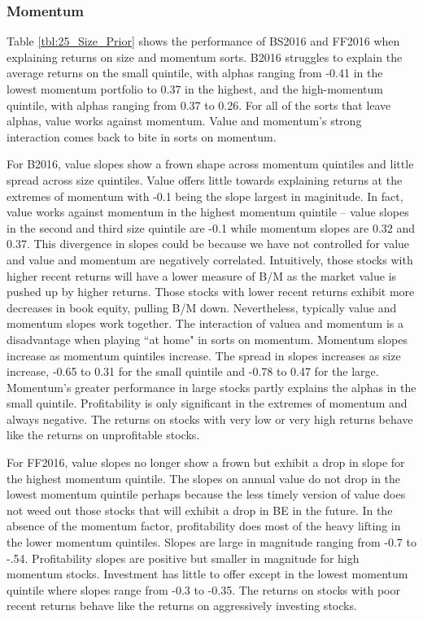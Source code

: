 
\subsubsection{Momentum}


Table \ref{tbl:25_Size_Prior} shows the performance of BS2016 and FF2016 when explaining
returns on size and momentum sorts. B2016 struggles to explain the average returns on the
small quintile, with alphas ranging from -0.41 in the lowest momentum portfolio to 0.37 in
the highest, and the high-momentum quintile, with alphas ranging from 0.37 to 0.26. For
all of the sorts that leave alphas, value works against momentum. Value and momentum's
strong interaction comes back to bite in sorts on momentum.

For B2016, value slopes show a frown shape across momentum quintiles and little spread
across size quintiles. Value offers little towards explaining returns at the extremes of
momentum with -0.1 being the slope largest in maginitude. In fact, value works against
momentum in the highest momentum quintile -- value slopes in the second and third size
quintile are -0.1 while momentum slopes are 0.32 and 0.37. This divergence in slopes could
be because we have not controlled for value and value and momentum are negatively
correlated. Intuitively, those stocks with higher recent returns will have a lower measure
of B/M as the market value is pushed up by higher returns. Those stocks with lower recent
returns exhibit more decreases in book equity, pulling B/M down. Nevertheless, typically
value and momentum slopes work together. The interaction of valuea and momentum is a
disadvantage when playing ``at home" in sorts on momentum. Momentum slopes increase as
momentum quintiles increase. The spread in slopes increases as size increase, -0.65 to
0.31 for the small quintile and -0.78 to 0.47 for the large. Momentum's greater
performance in large stocks partly explains the alphas in the small quintile.
Profitability is only significant in the extremes of momentum and always negative. The
returns on stocks with very low or very high returns behave like the returns on
unprofitable stocks.

For FF2016, value slopes no longer show a frown but exhibit a drop in slope for the
highest momentum quintile. The slopes on annual value do not drop in the lowest momentum
quintile perhaps because the less timely version of value does not weed out those stocks
that will exhibit a drop in BE in the future. In the absence of the momentum factor,
profitability does most of the heavy lifting in the lower momentum quintiles. Slopes are
large in magnitude ranging from -0.7 to -.54. Profitability slopes are positive but
smaller in magnitude for high momentum stocks. Investment has little to offer except in
the lowest momentum quintile where slopes range from -0.3 to -0.35. The returns on stocks
with poor recent returns behave like the returns on aggressively investing stocks.

